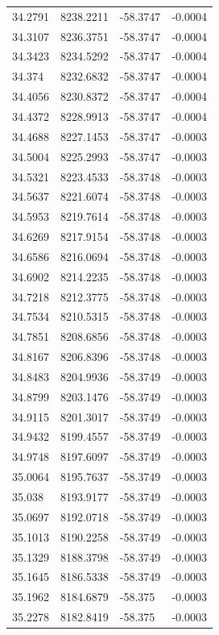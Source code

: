 \begin{table}[H]
\begin{tabular}{llll}
34.2791 & 8238.2211 & -58.3747 & -0.0004 \\
34.3107 & 8236.3751 & -58.3747 & -0.0004 \\
34.3423 & 8234.5292 & -58.3747 & -0.0004 \\
34.374 & 8232.6832 & -58.3747 & -0.0004 \\
34.4056 & 8230.8372 & -58.3747 & -0.0004 \\
34.4372 & 8228.9913 & -58.3747 & -0.0004 \\
34.4688 & 8227.1453 & -58.3747 & -0.0003 \\
34.5004 & 8225.2993 & -58.3747 & -0.0003 \\
34.5321 & 8223.4533 & -58.3748 & -0.0003 \\
34.5637 & 8221.6074 & -58.3748 & -0.0003 \\
34.5953 & 8219.7614 & -58.3748 & -0.0003 \\
34.6269 & 8217.9154 & -58.3748 & -0.0003 \\
34.6586 & 8216.0694 & -58.3748 & -0.0003 \\
34.6902 & 8214.2235 & -58.3748 & -0.0003 \\
34.7218 & 8212.3775 & -58.3748 & -0.0003 \\
34.7534 & 8210.5315 & -58.3748 & -0.0003 \\
34.7851 & 8208.6856 & -58.3748 & -0.0003 \\
34.8167 & 8206.8396 & -58.3748 & -0.0003 \\
34.8483 & 8204.9936 & -58.3749 & -0.0003 \\
34.8799 & 8203.1476 & -58.3749 & -0.0003 \\
34.9115 & 8201.3017 & -58.3749 & -0.0003 \\
34.9432 & 8199.4557 & -58.3749 & -0.0003 \\
34.9748 & 8197.6097 & -58.3749 & -0.0003 \\
35.0064 & 8195.7637 & -58.3749 & -0.0003 \\
35.038 & 8193.9177 & -58.3749 & -0.0003 \\
35.0697 & 8192.0718 & -58.3749 & -0.0003 \\
35.1013 & 8190.2258 & -58.3749 & -0.0003 \\
35.1329 & 8188.3798 & -58.3749 & -0.0003 \\
35.1645 & 8186.5338 & -58.3749 & -0.0003 \\
35.1962 & 8184.6879 & -58.375 & -0.0003 \\
35.2278 & 8182.8419 & -58.375 & -0.0003 \\

\end{tabular}
\end{table}
